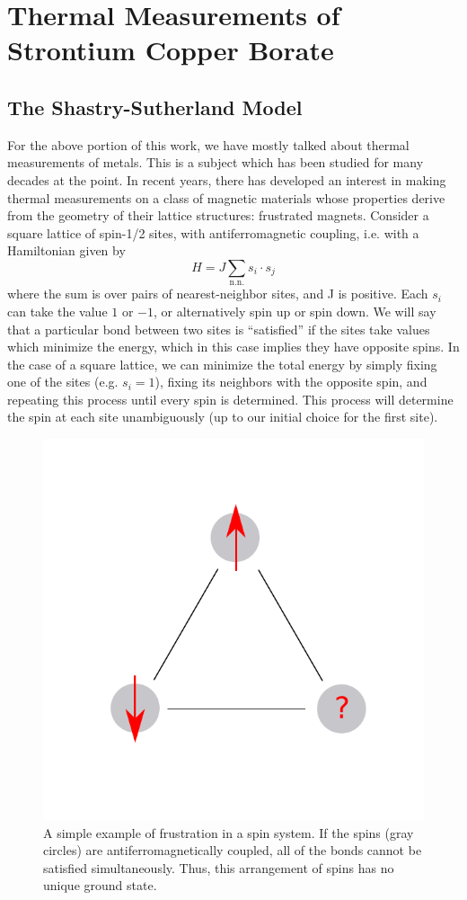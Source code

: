 \documentclass{thesis-umich}
\begin{document}
\chapter{Thermal Measurements of Strontium Copper Borate}

\section{The Shastry-Sutherland Model}
For the above portion of this work, we have mostly talked about thermal measurements of metals. This is a subject which has been studied for many decades at the point. In recent years, there has developed an interest in making thermal measurements on a class of magnetic materials whose properties derive from the geometry of their lattice structures: frustrated magnets. Consider a square lattice of spin-1/2 sites, with antiferromagnetic coupling, i.e. with a Hamiltonian given by
\[ H = J \sum_{\mathrm{n.n.}} s_i \cdot s_j\]
where the sum is over pairs of nearest-neighbor sites, and J is positive. Each $s_i$ can take the value $1$ or $-1$, or alternatively spin up or spin down. We will say that a particular bond between two sites is ``satisfied'' if the sites take values which minimize the energy, which in this case implies they have opposite spins. In the case of a square lattice, we can minimize the total energy by simply fixing one of the sites (e.g. $s_i = 1$), fixing its neighbors with the opposite spin, and repeating this process until every spin is determined. This process will determine the spin at each site unambiguously (up to our initial choice for the first site).
\begin{figure}
	\centering
	\caption[Frustration]{A simple example of frustration in a spin system. If the spins (gray circles) are antiferromagnetically coupled, all of the bonds cannot be satisfied simultaneously. Thus, this arrangement of spins has no unique ground state.}
	\label{fig:frustration}
	\includegraphics[width=0.6\columnwidth]{figures/frustration.pdf}
\end{figure}
\end{document}
